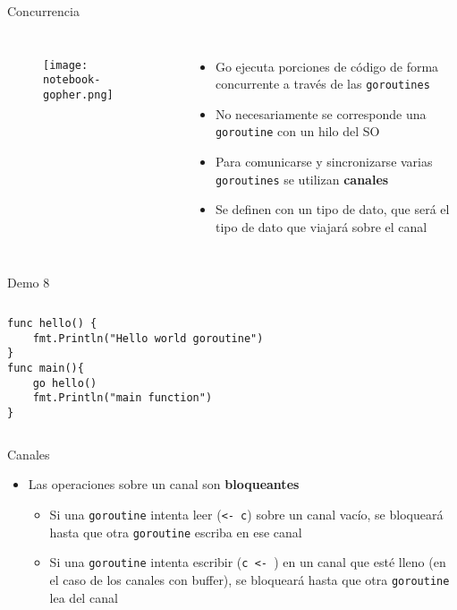 \begin{frame}{Concurrencia}
    \begin{columns}
            \begin{figure}[H]
                \centering
                \texttt{[image: notebook-gopher.png]}
            \end{figure}
            \begin{itemize}
                \item Go ejecuta porciones de código de forma concurrente a través de las \texttt{goroutines} 
                \item No necesariamente se corresponde una \texttt{goroutine} con un hilo del SO 
                \item Para comunicarse y sincronizarse varias \texttt{goroutines} se utilizan \textbf{canales} 
                \item Se definen con un tipo de dato, que será el tipo de dato que viajará sobre el canal 
            \end{itemize}
    \end{columns}
\end{frame}

\begin{frame}[fragile]{Demo 8}

{
    \renewcommand{\baselinestretch}{1} 

    \begin{columns}
        \begin{lstlisting}[title={Ejecución concurrente con \texttt{goroutines} \autocite{GolangBotGoroutines}}]
func hello() {
    fmt.Println("Hello world goroutine")
}
func main(){
    go hello()
    fmt.Println("main function")
}
        \end{lstlisting}
    \end{columns}
}

\end{frame}

\begin{frame}{Canales}
    \begin{itemize}
        \item Las operaciones sobre un canal son \textbf{bloqueantes} 
        \begin{itemize}
            \item Si una \texttt{goroutine} intenta leer (\texttt{<- c}) sobre un canal vacío, se bloqueará hasta que otra \texttt{goroutine} escriba en ese canal 
            \item Si una \texttt{goroutine} intenta escribir (\texttt{c <- }) en un canal que esté lleno (en el caso de los canales con buffer), se bloqueará hasta que otra \texttt{goroutine} lea del canal  
        \end{itemize}
    \end{itemize}
\end{frame}

